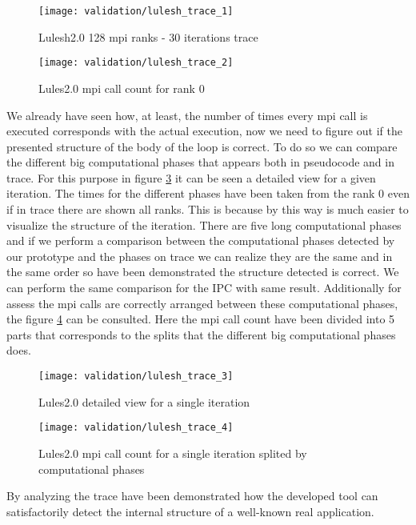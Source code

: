 \begin{figure}
    \centering
    \texttt{[image: validation/lulesh\_trace\_1]}
    \caption{Lulesh2.0 128 mpi ranks - 30 iterations trace}
    \label{fig:lulesh_trace_1}
\end{figure}

\begin{figure}
    \centering
    \texttt{[image: validation/lulesh\_trace\_2]}
    \caption{Lules2.0 mpi call count for rank 0}
    \label{fig:lulesh_trace_2}
\end{figure}


We already have seen how, at least, the number of times every mpi call is
executed corresponds with the actual execution, now we need to figure out if the
presented structure of the body of the loop is correct. To do so we can compare
the different big computational phases that appears both in pseudocode and in
trace. For this purpose in figure \ref{fig:lulesh_trace_3} it can be seen a 
detailed view for a given iteration. The times for the different phases have
been taken from the rank 0 even if in trace there are shown all ranks. This is
because by this way is much easier to visualize the structure of the iteration. There
are five long computational phases and if we perform a comparison between the
computational phases detected by our prototype and the phases on trace we
can realize they are the same and in the same order so have been demonstrated
the structure detected is correct. We can perform the same comparison for the
IPC with same result. Additionally for assess the mpi calls are
correctly arranged between these computational phases, the figure
\ref{fig:lulesh_trace_4} can be consulted. Here the mpi call count have been
divided into 5 parts that corresponds to the splits that the different big
computational phases does. 

\begin{figure}
    \centering
    \texttt{[image: validation/lulesh\_trace\_3]}
    \caption{Lules2.0 detailed view for a single iteration}
    \label{fig:lulesh_trace_3}
\end{figure}
\begin{figure}
    \centering
    \texttt{[image: validation/lulesh\_trace\_4]}
    \caption{Lules2.0 mpi call count for a single iteration splited by
    computational phases}
    \label{fig:lulesh_trace_4}
\end{figure}

By analyzing the trace have been demonstrated how the developed tool can
satisfactorily detect the internal structure of a well-known real application.


